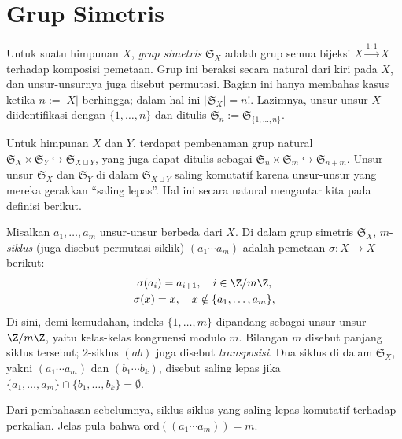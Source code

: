 \section{Grup Simetris}\label{sec:symmetric-group}
Untuk suatu himpunan $X$, \emph{grup simetris} $\mathfrak{S}_X$ adalah grup semua bijeksi $X \xrightarrow{1:1} X$ terhadap komposisi pemetaan. Grup ini beraksi secara natural dari kiri pada $X$, dan unsur-unsurnya juga disebut permutasi. Bagian ini hanya membahas kasus ketika $n := |X|$ berhingga; dalam hal ini $|\mathfrak{S}_X| = n!$. Lazimnya, unsur-unsur $X$ diidentifikasi dengan $\{1, \ldots, n\}$ dan ditulis $\mathfrak{S}_n := \mathfrak{S}_{\{1, \ldots, n\}}$.

Untuk himpunan $X$ dan $Y$, terdapat pembenaman grup natural $\mathfrak{S}_X \times \mathfrak{S}_Y \hookrightarrow \mathfrak{S}_{X \sqcup Y}$, yang juga dapat ditulis sebagai $\mathfrak{S}_n \times \mathfrak{S}_m \hookrightarrow \mathfrak{S}_{n+m}$. Unsur-unsur $\mathfrak{S}_X$ dan $\mathfrak{S}_Y$ di dalam $\mathfrak{S}_{X \sqcup Y}$ saling komutatif karena unsur-unsur yang mereka gerakkan ``saling lepas''. Hal ini secara natural mengantar kita pada definisi berikut.

\begin{definition} 
	Misalkan $a_1, \ldots, a_m$ unsur-unsur berbeda dari $X$. Di dalam grup simetris $\mathfrak{S}_X$, $m$-\emph{siklus} (juga disebut permutasi siklik) $(a_1 \cdots a_m)$ adalah pemetaan $\sigma: X \to X$ berikut:
	\begin{gather*}
		\sigma(a_i) = a_{i+1}, \quad i \in \Z/m\Z, \\
		\sigma(x)=x, \quad x \notin \{a_1, \ldots, a_m\},
	\end{gather*}
	Di sini, demi kemudahan, indeks $\{1, \ldots, m\}$ dipandang sebagai unsur-unsur $\Z/m\Z$, yaitu kelas-kelas kongruensi modulo $m$. Bilangan $m$ disebut panjang siklus tersebut; $2$-siklus $(a b)$ juga disebut \emph{transposisi}. Dua siklus di dalam $\mathfrak{S}_X$, yakni $(a_1 \cdots a_m)$ dan $(b_1 \cdots b_k)$, disebut saling lepas jika $\{a_1, \ldots, a_m\} \cap \{b_1, \ldots, b_k\} = \emptyset$.
\end{definition}
Dari pembahasan sebelumnya, siklus-siklus yang saling lepas komutatif terhadap perkalian. Jelas pula bahwa $\text{ord}((a_1 \cdots a_m)) = m$.

